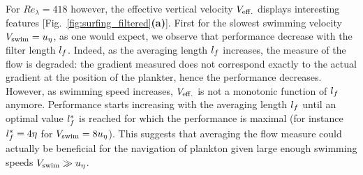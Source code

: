 For $\mathit{Re}_{\lambda} = 418$ however, the effective vertical velocity $V_{\mathrm{eff.}}$ displays interesting features [Fig.~\ref{fig:surfing_filtered}\textbf{(a)}].
First for the slowest swimming velocity $V_{\mathrm{swim}} = u_{\eta}$, as one would expect, we observe that performance decrease with the filter length $l_{f}$.
Indeed, as the averaging length $l_{f}$ increases, the measure of the flow is degraded: the gradient measured does not correspond exactly to the actual gradient at the position of the plankter, hence the performance decreases.
However, as swimming speed increases, $V_{\mathrm{eff.}}$ is not a monotonic function of $l_{f}$ anymore.
Performance starts increasing with the averaging length $l_{f}$ until an optimal value $l_{f}^*$ is reached for which the performance is maximal (for instance $l_{f}^* = 4 \eta$ for $V_{\mathrm{swim}} = 8 u_{\eta}$).
This suggests that averaging the flow measure could actually be beneficial for the navigation of plankton given large enough swimming speeds $V_{\mathrm{swim}} \gg u_{\eta}$.

